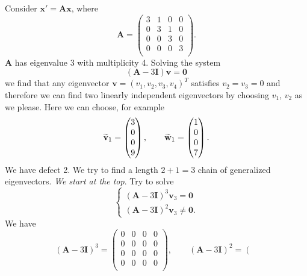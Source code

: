 \documentclass[12pt]{article}
\newcommand{\bx}{\mathbf{x}}
\newcommand{\bv}{\mathbf{v}}
\newcommand{\bw}{\mathbf{w}}
\newcommand{\bA}{\mathbf{A}}
\newcommand{\bI}{\mathbf{I}}
\begin{document}
\begin{example}
	Consider $\bx'=\bA\bx$, where 
	\begin{equation}
		\bA=\left(
\begin{array}{cccc}
 3 & 1 & 0 & 0 \\
 0 & 3 & 1 & 0 \\
 0 & 0 & 3 & 0 \\
 0 & 0 & 0 & 3 \\
\end{array}
\right).
	\end{equation}
$\bA$ has eigenvalue $3$ with multiplicity 4.
Solving the system 
\begin{equation}
	(\bA-3\bI)\bv=\mathbf{0}
\end{equation} 
we find that any eigenvector $\bv=(v_1,v_2,v_3,v_4)^T$ satisfies $v_2=v_3=0$ and therefore we can find two linearly independent eigenvectors by choosing $v_1$, $v_2$ as we please.
Here we can choose, for example
\begin{equation}
	\td{\bv}_1=\begin{pmatrix}
		3\\
		0\\
		0\\
		9
	\end{pmatrix},\qquad \td{\bw}_1=\begin{pmatrix}
		1\\
		0\\
		0\\
		7
	\end{pmatrix}.
\end{equation}
We have defect 2. We try to find a length $2+1=3$ chain of generalized eigenvectors.
\emph{We start at the top}.
Try to solve
\begin{equation}\label{eq:e-vectors}
		\begin{cases}
			(\bA-3 \bI)^{3}\bv_{3}=\mathbf{0}\\
			(\bA-3 \bI)^{2}\bv_{3}\neq \mathbf{0}.
		\end{cases}
	\end{equation}
We have 
\begin{equation}
	(\bA-3 \bI)^{3}= \left(
\begin{array}{cccc}
 0 & 0 & 0 & 0 \\
 0 & 0 & 0 & 0 \\
 0 & 0 & 0 & 0 \\
 0 & 0 & 0 & 0 \\
\end{array}
\right),
	\qquad (\bA-3 \bI)^{2}=\left(
\begin{array}{cccc}

\end{array}
\end{equation}
\end{example}
\end{document}
